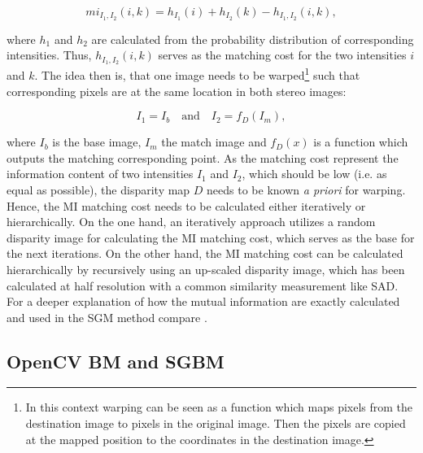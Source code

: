 \begin{equation}
  mi_{I_1,I_2}(i,k) = h_{I_1}(i) + h_{I_2}(k) - h_{I_1,I_2}(i,k),
\end{equation}

\noindent where $h_1$ and $h_2$ are calculated from the probability distribution of corresponding intensities.
Thus, $h_{I_1,I_2}(i,k)$ serves as the matching cost for the two intensities $i$ and $k$.
The idea then is, that one image needs to be warped\footnote{In this context warping can be seen as a function which maps pixels from the destination image to pixels in the original image. Then the pixels are copied at the mapped position to the coordinates in the destination image.} such that corresponding pixels are at the same location in both stereo images:

\begin{equation}
    I_1 = I_b\quad \textrm{and}\quad I_2 = f_D(I_m),
\end{equation}

\noindent where $I_b$ is the base image, $I_m$ the match image and $f_D(x)$ is a function which outputs the matching corresponding point.
As the matching cost represent the information content of two intensities $I_1$ and $I_2$, which should be low (i.e. as equal as possible), the disparity map $D$ needs to be known \textit{a priori} for warping.
Hence, the MI matching cost needs to be calculated either iteratively or hierarchically.
On the one hand, an iteratively approach utilizes a random disparity image for calculating the MI matching cost, which serves as the base for the next iterations.
On the other hand, the MI matching cost can be calculated hierarchically by recursively using an up-scaled disparity image, which has been calculated at half resolution with a common similarity measurement like SAD.
For a deeper explanation of how the mutual information are exactly calculated and used in the SGM method compare \citep{hirschmuller2005accurate, hirschmuller2007evaluation, hirschmuller2008stereo, hirschmuller2011semi}.

\subsection*{OpenCV BM and SGBM}


